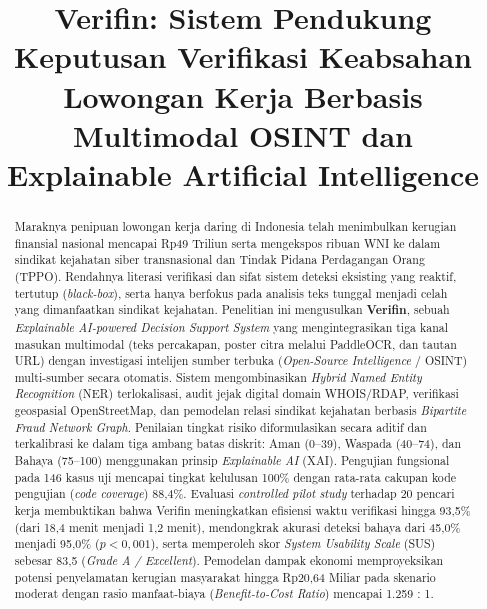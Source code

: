 \documentclass[conference]{IEEEtran}
\begin{document}
\title{Verifin: Sistem Pendukung Keputusan Verifikasi Keabsahan Lowongan Kerja Berbasis Multimodal OSINT dan Explainable Artificial Intelligence}

\author{
}

\maketitle

\begin{abstract}
Maraknya penipuan lowongan kerja daring di Indonesia telah menimbulkan kerugian finansial nasional mencapai Rp49 Triliun serta mengekspos ribuan WNI ke dalam sindikat kejahatan siber transnasional dan Tindak Pidana Perdagangan Orang (TPPO). Rendahnya literasi verifikasi dan sifat sistem deteksi eksisting yang reaktif, tertutup (\textit{black-box}), serta hanya berfokus pada analisis teks tunggal menjadi celah yang dimanfaatkan sindikat kejahatan. Penelitian ini mengusulkan \textbf{Verifin}, sebuah \textit{Explainable AI-powered Decision Support System} yang mengintegrasikan tiga kanal masukan multimodal (teks percakapan, poster citra melalui PaddleOCR, dan tautan URL) dengan investigasi intelijen sumber terbuka (\textit{Open-Source Intelligence} / OSINT) multi-sumber secara otomatis. Sistem mengombinasikan \textit{Hybrid Named Entity Recognition} (NER) terlokalisasi, audit jejak digital domain WHOIS/RDAP, verifikasi geospasial OpenStreetMap, dan pemodelan relasi sindikat kejahatan berbasis \textit{Bipartite Fraud Network Graph}. Penilaian tingkat risiko diformulasikan secara aditif dan terkalibrasi ke dalam tiga ambang batas diskrit: Aman (0--39), Waspada (40--74), dan Bahaya (75--100) menggunakan prinsip \textit{Explainable AI} (XAI). Pengujian fungsional pada 146 kasus uji mencapai tingkat kelulusan 100\% dengan rata-rata cakupan kode pengujian (\textit{code coverage}) 88,4\%. Evaluasi \textit{controlled pilot study} terhadap 20 pencari kerja membuktikan bahwa Verifin meningkatkan efisiensi waktu verifikasi hingga 93,5\% (dari 18,4 menit menjadi 1,2 menit), mendongkrak akurasi deteksi bahaya dari 45,0\% menjadi 95,0\% ($p < 0{,}001$), serta memperoleh skor \textit{System Usability Scale} (SUS) sebesar 83,5 (\textit{Grade A / Excellent}). Pemodelan dampak ekonomi memproyeksikan potensi penyelamatan kerugian masyarakat hingga Rp20,64 Miliar pada skenario moderat dengan rasio manfaat-biaya (\textit{Benefit-to-Cost Ratio}) mencapai 1.259 : 1.
\end{abstract}
\end{document}
